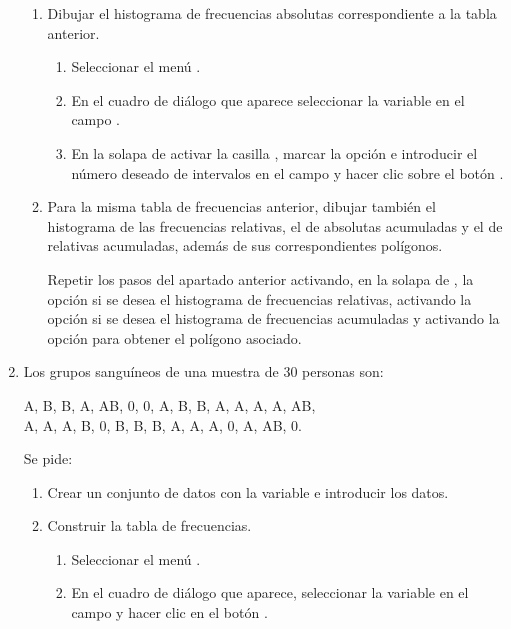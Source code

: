 \begin{enumerate}[leftmargin=*]
\begin{enumerate}
\item  Dibujar el histograma de frecuencias absolutas correspondiente a la tabla anterior.
\begin{indicacion}{
\begin{enumerate}
\item Seleccionar el menú .
\item En el cuadro de diálogo que aparece seleccionar la variable  en el campo .
\item En la solapa de  activar la casilla , marcar la opción  e introducir el número deseado de intervalos en el campo  y hacer clic sobre el botón
.
\end{enumerate}}
\end{indicacion}

\item Para la misma tabla de frecuencias anterior, dibujar también el histograma de las frecuencias relativas, el de
absolutas acumuladas y el de relativas acumuladas, además de sus correspondientes polígonos.
\begin{indicacion}{Repetir los pasos del apartado anterior activando, en la solapa de ,
la opción  si se desea el histograma de frecuencias relativas, activando la opción
 si se desea el histograma de frecuencias acumuladas y activando la opción
 para obtener el polígono asociado.}
\end{indicacion}
\end{enumerate}

\item Los grupos sanguíneos de una muestra de 30 personas son:
\begin{center}
A, B, B, A, AB, 0, 0, A, B, B, A, A, A, A, AB,\\
A, A, A, B, 0, B, B, B, A, A, A, 0, A, AB, 0. 
\end{center}
Se pide:
\begin{enumerate}
\item Crear un conjunto de datos con la variable  e introducir los datos.

\item Construir la tabla de frecuencias.
\begin{indicacion}{
\begin{enumerate}
\item Seleccionar el menú  .
\item En el cuadro de diálogo que aparece, seleccionar la variable  en el campo
 y hacer clic en el botón .
\end{enumerate}}
\end{indicacion}


\end{enumerate}
\end{enumerate}
